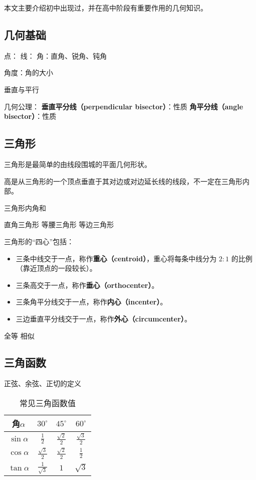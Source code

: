 
\begin{issues}
\issueDraft
\end{issues}

本文主要介绍初中出现过，并在高中阶段有重要作用的几何知识。

\subsection{几何基础}

点：
线：
角：直角、锐角、钝角

角度：角的大小

垂直与平行

几何公理：
\textbf{垂直平分线（perpendicular bisector）}：性质
\textbf{角平分线（angle bisector）}：性质

\subsection{三角形}

三角形是最简单的由线段围城的平面几何形状。

高是从三角形的一个顶点垂直于其对边或对边延长线的线段，不一定在三角形内部。

三角形内角和

直角三角形
等腰三角形
等边三角形


三角形的“四心”包括：
\begin{itemize}
\item 三条中线交于一点，称作\textbf{重心（centroid）}，重心将每条中线分为 $2:1$ 的比例（靠近顶点的一段较长）。
\item 三条高交于一点，称作\textbf{垂心（orthocenter）}。
\item 三条角平分线交于一点，称作\textbf{内心（incenter）}。
\item 三边垂直平分线交于一点，称作\textbf{外心（circumcenter）}。
\end{itemize}

全等
相似

\subsection{三角函数}

正弦、余弦、正切的定义

\begin{table}[ht]
\centering
\caption{常见三角函数值}\label{tab_HsGeBa1}
\begin{tabular}{|c|c|c|c|}
\hline
角$\alpha$ & $30^{\circ}$ & $45^{\circ}$ & $60^{\circ}$ \\
\hline
$\sin\alpha$ & $\displaystyle\frac{1}{2}$ & $\displaystyle\frac{\sqrt{2}}{2}$ & $\displaystyle\frac{\sqrt{3}}{2}$ \\
\hline
$\cos\alpha$ & $\displaystyle\frac{\sqrt{3}}{2}$& $\displaystyle\frac{\sqrt{2}}{2}$ &  $\displaystyle\frac{1}{2}$ \\
\hline
$\tan\alpha$ & $\displaystyle\frac{1}{\sqrt{3}}$ & $1$ & $\sqrt{3}$ \\
\hline
\end{tabular}
\end{table}
